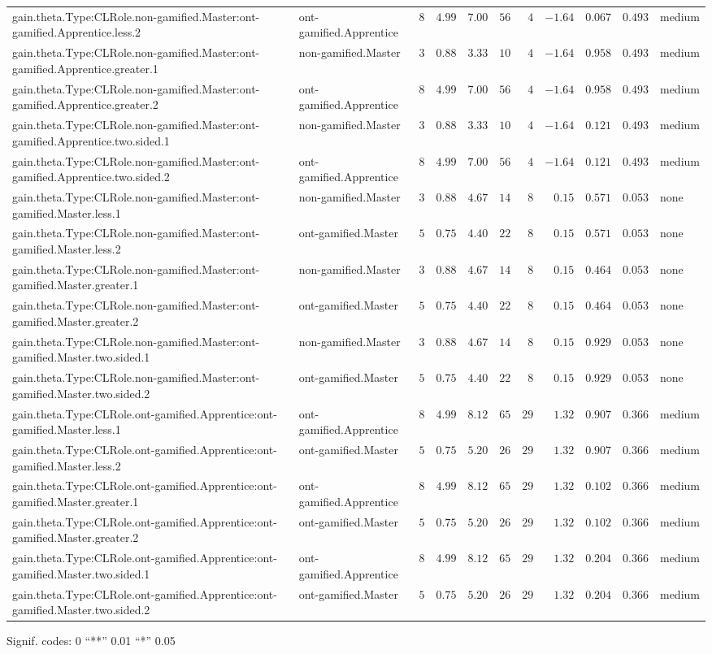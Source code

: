 \documentclass[6pt]{article}
\begin{document}
\begin{landscape}
{\begin{longtable}{llrrrrrrrrl}
gain.theta.Type:CLRole.non-gamified.Master:ont-gamified.Apprentice.less.2&ont-gamified.Apprentice&$ 8$&$4.99$&$ 7.00$&$ 56$&$ 4$&$-1.64$&$0.067$&$0.493$&medium\tabularnewline
gain.theta.Type:CLRole.non-gamified.Master:ont-gamified.Apprentice.greater.1&non-gamified.Master&$ 3$&$0.88$&$ 3.33$&$ 10$&$ 4$&$-1.64$&$0.958$&$0.493$&medium\tabularnewline
gain.theta.Type:CLRole.non-gamified.Master:ont-gamified.Apprentice.greater.2&ont-gamified.Apprentice&$ 8$&$4.99$&$ 7.00$&$ 56$&$ 4$&$-1.64$&$0.958$&$0.493$&medium\tabularnewline
gain.theta.Type:CLRole.non-gamified.Master:ont-gamified.Apprentice.two.sided.1&non-gamified.Master&$ 3$&$0.88$&$ 3.33$&$ 10$&$ 4$&$-1.64$&$0.121$&$0.493$&medium\tabularnewline
gain.theta.Type:CLRole.non-gamified.Master:ont-gamified.Apprentice.two.sided.2&ont-gamified.Apprentice&$ 8$&$4.99$&$ 7.00$&$ 56$&$ 4$&$-1.64$&$0.121$&$0.493$&medium\tabularnewline
gain.theta.Type:CLRole.non-gamified.Master:ont-gamified.Master.less.1&non-gamified.Master&$ 3$&$0.88$&$ 4.67$&$ 14$&$ 8$&$ 0.15$&$0.571$&$0.053$&none\tabularnewline
gain.theta.Type:CLRole.non-gamified.Master:ont-gamified.Master.less.2&ont-gamified.Master&$ 5$&$0.75$&$ 4.40$&$ 22$&$ 8$&$ 0.15$&$0.571$&$0.053$&none\tabularnewline
gain.theta.Type:CLRole.non-gamified.Master:ont-gamified.Master.greater.1&non-gamified.Master&$ 3$&$0.88$&$ 4.67$&$ 14$&$ 8$&$ 0.15$&$0.464$&$0.053$&none\tabularnewline
gain.theta.Type:CLRole.non-gamified.Master:ont-gamified.Master.greater.2&ont-gamified.Master&$ 5$&$0.75$&$ 4.40$&$ 22$&$ 8$&$ 0.15$&$0.464$&$0.053$&none\tabularnewline
gain.theta.Type:CLRole.non-gamified.Master:ont-gamified.Master.two.sided.1&non-gamified.Master&$ 3$&$0.88$&$ 4.67$&$ 14$&$ 8$&$ 0.15$&$0.929$&$0.053$&none\tabularnewline
gain.theta.Type:CLRole.non-gamified.Master:ont-gamified.Master.two.sided.2&ont-gamified.Master&$ 5$&$0.75$&$ 4.40$&$ 22$&$ 8$&$ 0.15$&$0.929$&$0.053$&none\tabularnewline
gain.theta.Type:CLRole.ont-gamified.Apprentice:ont-gamified.Master.less.1&ont-gamified.Apprentice&$ 8$&$4.99$&$ 8.12$&$ 65$&$29$&$ 1.32$&$0.907$&$0.366$&medium\tabularnewline
gain.theta.Type:CLRole.ont-gamified.Apprentice:ont-gamified.Master.less.2&ont-gamified.Master&$ 5$&$0.75$&$ 5.20$&$ 26$&$29$&$ 1.32$&$0.907$&$0.366$&medium\tabularnewline
gain.theta.Type:CLRole.ont-gamified.Apprentice:ont-gamified.Master.greater.1&ont-gamified.Apprentice&$ 8$&$4.99$&$ 8.12$&$ 65$&$29$&$ 1.32$&$0.102$&$0.366$&medium\tabularnewline
gain.theta.Type:CLRole.ont-gamified.Apprentice:ont-gamified.Master.greater.2&ont-gamified.Master&$ 5$&$0.75$&$ 5.20$&$ 26$&$29$&$ 1.32$&$0.102$&$0.366$&medium\tabularnewline
\newpage
gain.theta.Type:CLRole.ont-gamified.Apprentice:ont-gamified.Master.two.sided.1&ont-gamified.Apprentice&$ 8$&$4.99$&$ 8.12$&$ 65$&$29$&$ 1.32$&$0.204$&$0.366$&medium\tabularnewline
gain.theta.Type:CLRole.ont-gamified.Apprentice:ont-gamified.Master.two.sided.2&ont-gamified.Master&$ 5$&$0.75$&$ 5.20$&$ 26$&$29$&$ 1.32$&$0.204$&$0.366$&medium\tabularnewline
\hline
\end{longtable}}\end{landscape}
\begin{flushright}{ \tiny{ Signif. codes:  0 ``**'' 0.01 ``*'' 0.05 }}\end{flushright} 
\end{document}
